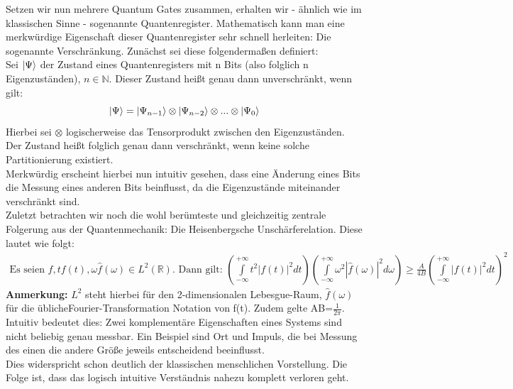 Setzen wir nun mehrere Quantum Gates zusammen, erhalten wir - ähnlich wie im klassischen Sinne - sogenannte Quantenregister. Mathematisch kann man eine merkwürdige Eigenschaft dieser Quantenregister sehr schnell herleiten: Die sogenannte Verschränkung. Zunächst sei diese folgendermaßen definiert\cite[Seiten 53,55]{QuantumComputingHomeister}:\\

Sei $\ket{\Psi}$ der Zustand eines Quantenregisters mit n Bits (also folglich n Eigenzuständen), \(n \in \mathbb{N}\). Dieser Zustand heißt genau dann unverschränkt, wenn gilt:\\
\begin{equation}
    \ket{\Psi} = \ket{\Psi_{n-1}} \otimes \ket{\Psi_{n-2}} \otimes ... \otimes \ket{\Psi_{0}}
\end{equation}
Hierbei sei $\otimes$ logischerweise das Tensorprodukt zwischen den Eigenzuständen.\\
Der Zustand heißt folglich genau dann verschränkt, wenn keine solche Partitionierung existiert.\\
Merkwürdig erscheint hierbei nun intuitiv gesehen, dass eine Änderung eines Bits die Messung eines anderen Bits beinflusst, da die Eigenzustände miteinander verschränkt sind.\\

Zuletzt betrachten wir noch die wohl berümteste und gleichzeitig zentrale Folgerung aus der Quantenmechanik: Die Heisenbergsche Unschärferelation. Diese lautet wie folgt\cite{HeisenbergPascuzzo}:\\
\begin{equation}
\begin{split}
\text{Es seien } f,tf(t), \omega \hat{f}(\omega) \in L^2(\mathbb{R}).\text{ Dann gilt: }
(\int\limits_{-\infty}^{+\infty} t^2|f(t)|^2 dt)(\int\limits_{-\infty}^{+\infty} \omega^2|\hat{f}(\omega)|^2 d\omega)\ge \frac{A}{4B}(\int\limits_{-\infty}^{+\infty} |f(t)|^2 dt)^2
\end{split}
\end{equation}
\textbf{Anmerkung:} \(L^2\) steht hierbei für den 2-dimensionalen Lebesgue-Raum, $\hat{f}(\omega)$ für die übliche\linebreak Fourier-Transformation Notation von f(t). Zudem gelte AB=$\frac{1}{2\pi}$.\\
Intuitiv bedeutet dies: Zwei komplementäre Eigenschaften eines Systems sind nicht beliebig genau messbar. Ein Beispiel sind Ort und Impuls, die bei Messung des einen die andere Größe jeweils entscheidend beeinflusst.\\
Dies widerspricht schon deutlich der klassischen menschlichen Vorstellung. Die Folge ist, dass das logisch intuitive Verständnis nahezu komplett verloren geht.\\
